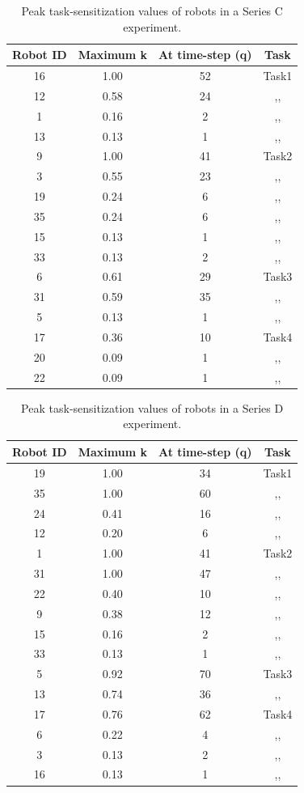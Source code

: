 \documentclass[final,5p,times,twocolumn]{elsarticle}
\begin{document}
\begin{table}
\centering
\caption{Peak task-sensitization values of robots in a Series C experiment.}
\begin{tabular}{|c|c|c|c|}
\hline\textbf{ Robot ID} & \textbf{Maximum k} & \textbf{At time-step (q)} & \textbf{Task} \\
\hline 16 & 1.00 & 52 & Task1\\
\hline 12 & 0.58 & 24 & ,,\\  
\hline 1 & 0.16 & 2 & ,,\\ 
\hline 13 & 0.13 & 1 & ,,\\
\hline 9 & 1.00 & 41 & Task2\\
\hline 3 & 0.55 & 23 & ,,\\ 
\hline 19 & 0.24 & 6 & ,,\\
\hline 35 & 0.24 & 6 & ,,\\
\hline 15 & 0.13 & 1 & ,,\\
\hline 33 & 0.13 & 2 & ,,\\ 
\hline 6 & 0.61 & 29 & Task3\\
\hline 31 & 0.59 & 35 & ,,\\ 
\hline 5 & 0.13 & 1 & ,,\\ 
\hline 17 & 0.36 & 10 & Task4\\
\hline 20 & 0.09 & 1 & ,,\\ 
\hline 22 & 0.09 & 1 & ,,\\ 
 \hline 
\end{tabular} 
\label{table:K-Q-SC}
\end{table}
\begin{table}
\centering
\caption{Peak task-sensitization values of robots in a Series D experiment.}
\begin{tabular}{|c|c|c|c|}
\hline\textbf{ Robot ID} & \textbf{Maximum k} & \textbf{At time-step (q)} & \textbf{Task} \\
\hline 19 & 1.00 & 34 & Task1\\
\hline 35 & 1.00 & 60 & ,,\\
\hline 24 & 0.41 & 16 & ,,\\
\hline 12 & 0.20 & 6 & ,,\\  
\hline 1 & 1.00 & 41 & Task2\\
\hline 31 & 1.00 & 47 & ,,\\
\hline 22 & 0.40 & 10 & ,,\\
\hline 9 & 0.38 & 12 & ,,\\
\hline 15 & 0.16 & 2 & ,,\\
\hline 33 & 0.13 & 1 & ,,\\ 
\hline 5 & 0.92 & 70 & Task3\\ 
\hline 13 & 0.74 & 36 & ,,\\
\hline 17 & 0.76 & 62 & Task4\\ 
\hline 6 & 0.22 & 4 & ,,\\ 
\hline 3 & 0.13 & 2 & ,,\\
\hline 16 & 0.13 & 1 & ,,\\ 
\hline 
\end{tabular}
\label{table:K-Q-SD} 
\end{table}
\end{document}
